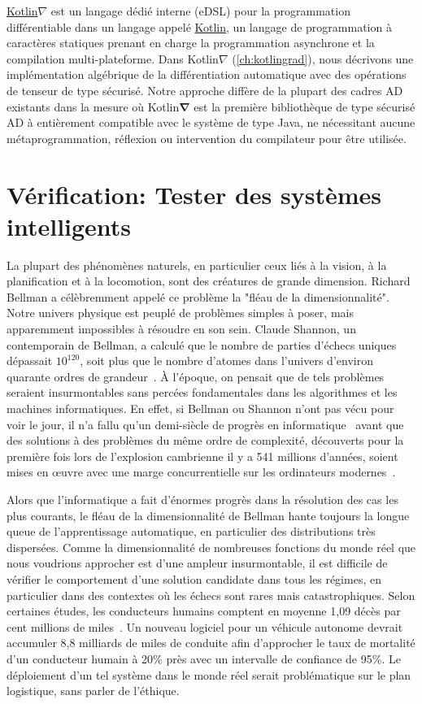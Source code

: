 \href{https://github.com/breandan/kotlingrad/}{Kotlin$\nabla$} est un langage dédié interne (eDSL) pour la programmation différentiable dans un langage appelé \href{https://kotlinlang.org}{Kotlin}, un langage de programmation à caractères statiques prenant en charge la programmation asynchrone et la compilation multi-plateforme. Dans Kotlin$\nabla$ (\autoref{ch:kotlingrad}), nous décrivons une implémentation algébrique de la différentiation automatique avec des opérations de tenseur de type sécurisé. Notre approche diffère de la plupart des cadres AD existants dans la mesure où Kotlin$\mathbf{\nabla}$ est la première bibliothèque de type sécurisé AD à entièrement compatible avec le système de type Java, ne nécessitant aucune métaprogrammation, réflexion ou intervention du compilateur pour être utilisée.

\section{Vérification: Tester des systèmes intelligents}

La plupart des phénomènes naturels, en particulier ceux liés à la vision, à la planification et à la locomotion, sont des créatures de grande dimension. Richard Bellman a célèbremment appelé ce problème la "fléau de la dimensionnalité". Notre univers physique est peuplé de problèmes simples à poser, mais apparemment impossibles à résoudre en son sein. Claude Shannon, un contemporain de Bellman, a calculé que le nombre de parties d'échecs uniques dépassait $10^{120}$, soit plus que le nombre d'atomes dans l'univers d'environ quarante ordres de grandeur~\citep{shannon1950chess}. À l'époque, on pensait que de tels problèmes seraient insurmontables sans percées fondamentales dans les algorithmes et les machines informatiques. En effet, si Bellman ou Shannon n'ont pas vécu pour voir le jour, il n'a fallu qu'un demi-siècle de progrès en informatique~\citep{campbell2002deep} avant que des solutions à des problèmes du même ordre de complexité, découverts pour la première fois lors de l'explosion cambrienne il y a 541 millions d'années, soient mises en œuvre avec une marge concurrentielle sur les ordinateurs modernes~\citep{pratt2015cambrian}.

Alors que l'informatique a fait d'énormes progrès dans la résolution des cas les plus courants, le fléau de la dimensionnalité de Bellman hante toujours la longue queue de l'apprentissage automatique, en particulier des distributions très dispersées. Comme la dimensionnalité de nombreuses fonctions du monde réel que nous voudrions approcher est d'une ampleur insurmontable, il est difficile de vérifier le comportement d'une solution candidate dans tous les régimes, en particulier dans des contextes où les échecs sont rares mais catastrophiques. Selon certaines études, les conducteurs humains comptent en moyenne 1,09 décès par cent millions de miles~\citep{kalra2016driving}. Un nouveau logiciel pour un véhicule autonome devrait accumuler 8,8 milliards de miles de conduite afin d'approcher le taux de mortalité d'un conducteur humain à 20\% près avec un intervalle de confiance de 95\%. Le déploiement d'un tel système dans le monde réel serait problématique sur le plan logistique, sans parler de l'éthique.

